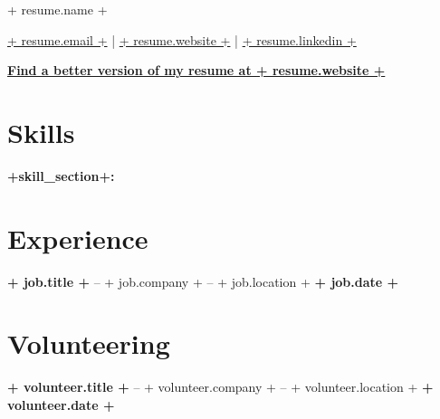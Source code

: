 \documentclass[11pt]{article}       %
\begin{document}
\centerline{\Huge {+ resume.name +}}

\vspace{5pt}

\centerline{\href{mailto:{+ resume.email +}}{{+ resume.email +}} | \href{https://{+ resume.website +}}{{+ resume.website  +}} | \href{https://{+ resume.linkedin +}}{{+ resume.linkedin +}}}
\centerline{\textbf{\href{https://{+ resume.website +}}{Find a better version of my resume at {+ resume.website +}}}}

\vspace{-10pt}

\section*{Skills}
{%
\textbf{{+skill_section+}:} {%
{%

\vspace{-6.5pt}

\section*{Experience}

{%
\textbf{{+ job.title +}} -- {{+ job.company +}} -- {+ job.location +} \hfill \textbf{{+ job.date +}} \\

{%
\vspace{-5pt}
{%
{%

\vspace{-18.5pt}

\section*{Volunteering}
{%
\textbf{{+ volunteer.title +}} -- {+ volunteer.company +} -- {+ volunteer.location +} \hfill \textbf{{+ volunteer.date +}} \\
{%

}}}}}}}}}
\end{document}
